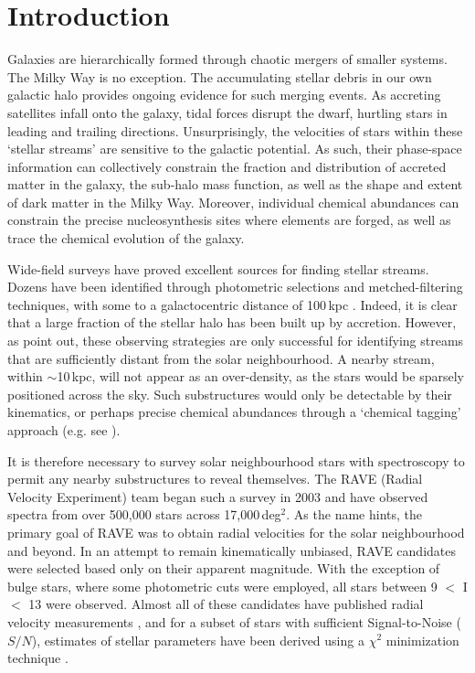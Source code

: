 \documentclass{emulateapj}
\begin{document}

\section{Introduction}
Galaxies are hierarchically formed through chaotic mergers of smaller systems. The Milky Way is no exception. The accumulating stellar debris in our own galactic halo provides ongoing evidence for such merging events. As accreting satellites infall onto the galaxy, tidal forces disrupt the dwarf, hurtling stars in leading and trailing directions. Unsurprisingly, the velocities of stars within these `stellar streams' are sensitive to the galactic potential. As such, their phase-space information can collectively constrain the fraction and distribution of accreted matter in the galaxy, the sub-halo mass function, as well as the shape and extent of dark matter in the Milky Way. Moreover, individual chemical abundances can constrain the  precise nucleosynthesis sites where elements are forged, as well as trace the chemical evolution of the galaxy.


Wide-field surveys have proved excellent sources for finding stellar streams. Dozens have been identified through photometric selections and metched-filtering techniques, with some to a galactocentric distance of 100\,kpc \citep{belokurov;et-al_2007,koposov_SG1, drake;et-al_2013}. Indeed, it is clear that a large fraction of the stellar halo has been built up by accretion. However, as \citet{helmi;white_1999} point out, these observing strategies are only successful for identifying streams that are sufficiently distant from the solar neighbourhood. A nearby stream, within $\sim$10\,kpc, will not appear as an over-density, as the stars would be sparsely positioned across the sky. Such substructures would only be detectable by their kinematics, or perhaps precise chemical abundances through a `chemical tagging' approach (e.g. see \citet{freeman;bland-hawthorn_2003}). 

It is therefore necessary to survey solar neighbourhood stars with spectroscopy to permit any nearby substructures to reveal themselves. The RAVE (Radial Velocity Experiment) team began such a survey in 2003 and have observed spectra from over 500,000 stars across 17,000\,deg$^{2}$. As the name hints, the primary goal of RAVE was to obtain radial velocities for the solar neighbourhood and beyond. In an attempt to remain kinematically unbiased, RAVE candidates were selected based only on their apparent magnitude. With the exception of bulge stars, where some photometric cuts were employed, all stars between 9 $<$ I $<$ 13 were observed. Almost all of these candidates have published radial velocity measurements \citep{steinmetz;et-al_2006}, and for a subset of stars with sufficient Signal-to-Noise ($S/N$), estimates of stellar parameters have been derived using a $\chi^2$ minimization technique \citep{zwitter;et-al_2008, siebert;et-al_2011}. 
\end{document}

